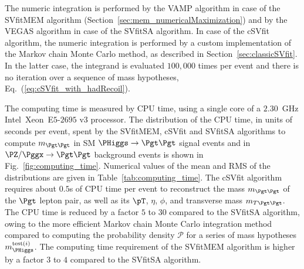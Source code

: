 The numeric integration is performed by the VAMP algorithm in case of
the SVfitMEM algorithm (\cf Section~\ref{sec:mem_numericalMaximization}) and by the VEGAS algorithm
in case of the SVfitSA algorithm.
In case of the cSVfit algorithm, the numeric integration is performed
by a custom implementation of the Markov chain Monte Carlo method, as described in Section~\ref{sec:classicSVfit}.
In the latter case, the integrand is evaluated $100,000$ times per event and there is no
iteration over a sequence of mass hypotheses, \cf Eq.~(\ref{eq:cSVfit_with_hadRecoil}).

The computing time is measured by CPU time, 
using a single core of a $2.30$~GHz Intel\TReg~Xeon\TReg~E$5$-$2695$ v$3$ processor.
The distribution of the CPU time, in units of seconds per event, 
spent by the SVfitMEM, cSVfit and SVfitSA algorithms
to compute $m_{\Pgt\Pgt}$ in SM $\PHiggs \to \Pgt\Pgt$ signal events and in $\PZ/\Pggx \to \Pgt\Pgt$ background events
is shown in Fig.~\ref{fig:computing_time}.
Numerical values of the mean and RMS of the distributions are given in Table~\ref{tab:computing_time}.
The cSVfit algorithm requires about $0.5$s of CPU time per event to reconstruct the mass $m_{\Pgt\Pgt}$ of the $\Pgt$ lepton pair,
as well as its $\pT$, $\eta$, $\phi$, and transverse mass $m_{T\Pgt\Pgt}$.
The CPU time is reduced by a factor $5$ to $30$ compared to the SVfitSA algorithm, 
owing to the more efficient Markov chain Monte
Carlo integration method compared to
computing the probability density $\mathcal{P}$
for a series of mass hypotheses $m_{\PHiggs}^{\textrm{test}(i)}$.
The computing time requirement of the SVfitMEM algorithm is higher by a factor $3$ to $4$ compared to the SVfitSA algorithm.

